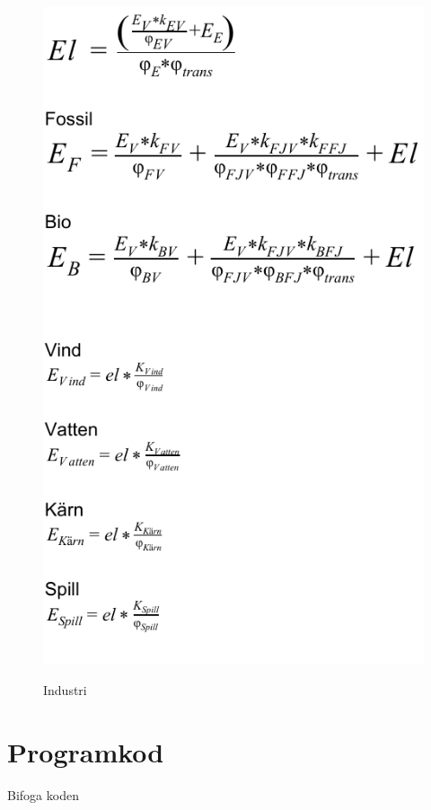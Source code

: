 \documentclass[a4paper,11pt,fleqn, titlepage]{article}
\begin{document}
\begin{figure}[!h]
	\centering 
 		\includegraphics[scale = 0.75]{industri2.pdf}
		\label{diagram4}
		\caption{Industri}
\end{figure}
\newpage


\section{Programkod}
Bifoga koden
\end{document}
